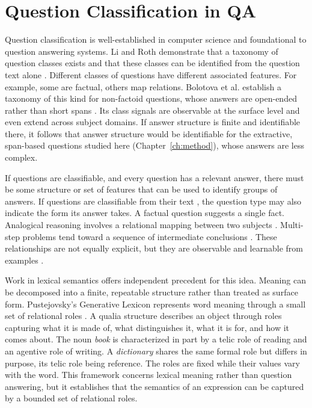 \documentclass[master]{thesis}
\newcommand{\cref}[1]{Chapter~\ref{#1}}  %
\begin{document}
\section{Question Classification in QA}
\label{sec:qclass}


Question classification is well-established in computer science and foundational to question answering systems. Li and Roth demonstrate that a taxonomy of question classes exists and that these classes can be identified from the question text alone \cite{liroth2002questions}. Different classes of questions have different associated features. For example, some are factual, others map relations. Bolotova et al. establish a taxonomy of this kind for non-factoid questions, whose answers are open-ended rather than short spans \cite{nonfactoid_taxonomy2022}. Its class signals are observable at the surface level and even extend across subject domains. If answer structure is finite and identifiable there, it follows that answer structure would be identifiable for the extractive, span-based questions studied here (\cref{ch:method}), whose answers are less complex.

If questions are classifiable, and every question has a relevant answer, there must be some structure or set of features that can be used to identify groups of answers. If questions are classifiable from their text \cite{liroth2002questions}, the question type may also indicate the form its answer takes. A factual question suggests a single fact. Analogical reasoning involves a relational mapping between two subjects \cite{analogical_reasoning2022}. Multi-step problems tend toward a sequence of intermediate conclusions \cite{wei2022cot}. These relationships are not equally explicit, but they are observable and learnable from examples \cite{devlin2019bert, xu2019qc_bert}.

Work in lexical semantics offers independent precedent for this idea. Meaning can be decomposed into a finite, repeatable structure rather than treated as surface form. Pustejovsky's Generative Lexicon represents word meaning through a small set of relational roles \cite{pustejovsky1991generative}. A qualia structure describes an object through roles capturing what it is made of, what distinguishes it, what it is for, and how it comes about. The noun \emph{book} is characterized in part by a telic role of reading and an agentive role of writing. A \emph{dictionary} shares the same formal role but differs in purpose, its telic role being reference. The roles are fixed while their values vary with the word. This framework concerns lexical meaning rather than question answering, but it establishes that the semantics of an expression can be captured by a bounded set of relational roles.
\end{document}
